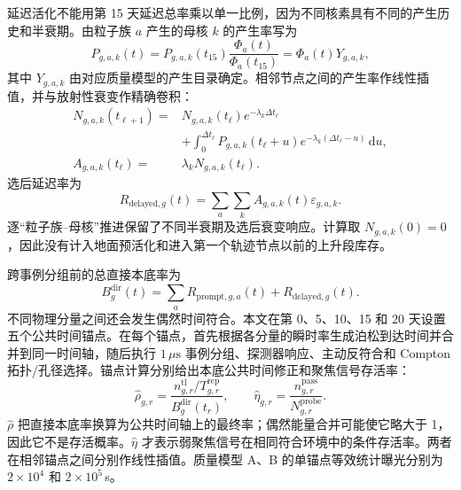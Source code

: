\documentclass[11pt]{article}
\begin{document}
延迟活化不能用第 15 天延迟总率乘以单一比例，因为不同核素具有不同的产生历史和半衰期。由粒子族 $a$ 产生的母核 $k$ 的产生率写为
\begin{equation}
 P_{g,a,k}(t)
 =P_{g,a,k}(t_{15})\frac{\Phi_a(t)}{\Phi_a(t_{15})}
 =\Phi_a(t)Y_{g,a,k},
 \label{eq:activation_production_zh}
\end{equation}
其中 $Y_{g,a,k}$ 由对应质量模型的产生目录确定。相邻节点之间的产生率作线性插值，并与放射性衰变作精确卷积：
\begin{equation}
 \begin{aligned}
 N_{g,a,k}(t_{\ell+1})={}&N_{g,a,k}(t_\ell)e^{-\lambda_k\Delta t_\ell}\\
 &+\int_0^{\Delta t_\ell}P_{g,a,k}(t_\ell+u)
 e^{-\lambda_k(\Delta t_\ell-u)}\,\mathrm du,\\
 A_{g,a,k}(t_\ell)={}&\lambda_kN_{g,a,k}(t_\ell).
 \end{aligned}
 \label{eq:delayed_inventory_zh}
\end{equation}
选后延迟率为
\begin{equation}
 R_{\mathrm{delayed},g}(t)=
 \sum_a\sum_kA_{g,a,k}(t)\varepsilon_{g,a,k}.
 \label{eq:delayed_selected_zh}
\end{equation}
逐“粒子族--母核”推进保留了不同半衰期及选后衰变响应。计算取 $N_{g,a,k}(0)=0$，因此没有计入地面预活化和进入第一个轨迹节点以前的上升段库存。

跨事例分组前的总直接本底率为
\begin{equation}
 B^{\mathrm{dir}}_g(t)
 =\sum_aR_{\mathrm{prompt},g,a}(t)+R_{\mathrm{delayed},g}(t).
 \label{eq:direct_background_time_zh}
\end{equation}
不同物理分量之间还会发生偶然时间符合。本文在第 0、5、10、15 和 20 天设置五个公共时间锚点。在每个锚点，首先根据各分量的瞬时率生成泊松到达时间并合并到同一时间轴，随后执行 $1\,\mu\mathrm{s}$ 事例分组、探测器响应、主动反符合和 Compton 拓扑/孔径选择。锚点计算分别给出本底公共时间修正和聚焦信号存活率：
\begin{equation}
 \widehat\rho_{g,r}=
 \frac{n^{\mathrm{tl}}_{g,r}/T^{\mathrm{rep}}_{g,r}}
 {B^{\mathrm{dir}}_g(t_r)},\qquad
 \widehat\eta_{g,r}=
 \frac{n^{\mathrm{pass}}_{g,r}}{N^{\mathrm{probe}}_{g,r}}.
 \label{eq:anchor_time_factors_zh}
\end{equation}
$\widehat\rho$ 把直接本底率换算为公共时间轴上的最终率；偶然能量合并可能使它略大于 1，因此它不是存活概率。$\widehat\eta$ 才表示弱聚焦信号在相同符合环境中的条件存活率。两者在相邻锚点之间分别作线性插值。质量模型 A、B 的单锚点等效统计曝光分别为 $2\times10^4$ 和 $2\times10^5$\,s。
\end{document}
